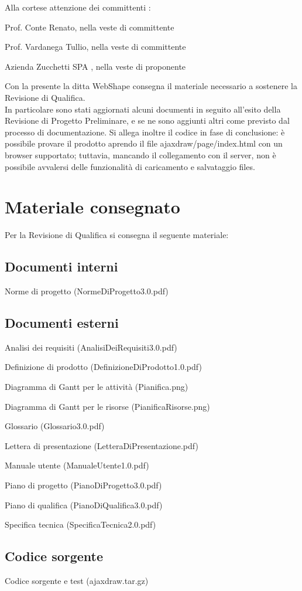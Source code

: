 Alla cortese attenzione dei committenti :
\begin{list}{-}{}
\item Prof. Conte Renato, nella veste di committente
\item Prof. Vardanega Tullio, nella veste di committente
\item Azienda Zucchetti SPA , nella veste di proponente
\end{list}

Con la presente la ditta WebShape consegna il materiale necessario a sostenere la Revisione di Qualifica. \\
In particolare sono stati aggiornati alcuni documenti in seguito all'esito della Revisione di Progetto Preliminare, e se ne sono aggiunti altri come previsto dal processo di documentazione. Si allega inoltre il codice in fase di conclusione: \`e possibile provare il prodotto aprendo il file ajaxdraw/page/index.html con un browser supportato; tuttavia, mancando il collegamento con il server, non \`e possibile avvalersi delle funzionalit\`a di caricamento e salvataggio files.


\section{Materiale consegnato}
Per la Revisione di Qualifica si consegna il seguente materiale: 
\subsection{Documenti interni}
\begin{list}{-}{}
\item Norme di progetto (NormeDiProgetto3.0.pdf)
\end{list}
\subsection{Documenti esterni}
\begin{list}{-}{}
\item Analisi dei requisiti (AnalisiDeiRequisiti3.0.pdf)
\item Definizione di prodotto (DefinizioneDiProdotto1.0.pdf)
\item Diagramma di Gantt per le attivit\`a (Pianifica.png)
\item Diagramma di Gantt per le risorse (PianificaRisorse.png)
\item Glossario (Glossario3.0.pdf)
\item Lettera di presentazione (LetteraDiPresentazione.pdf)
\item Manuale utente (ManualeUtente1.0.pdf)
\item Piano di progetto (PianoDiProgetto3.0.pdf)
\item Piano di qualifica (PianoDiQualifica3.0.pdf)
\item Specifica tecnica (SpecificaTecnica2.0.pdf)
\end{list}
\subsection{Codice sorgente}
\begin{list}{-}{}
\item Codice sorgente e test (ajaxdraw.tar.gz)
\end{list}


